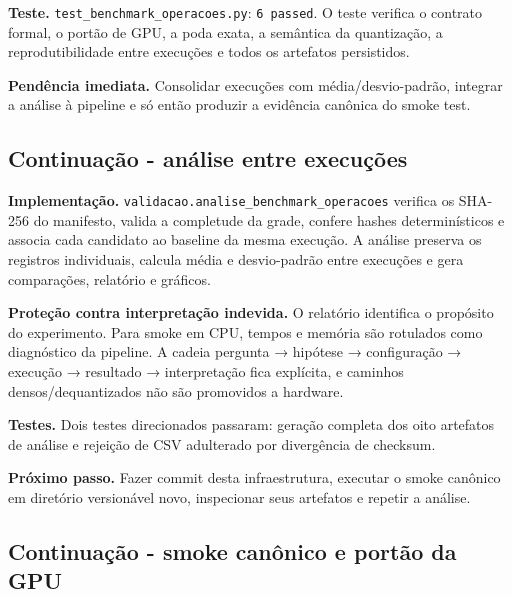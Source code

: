\textbf{Teste.} \texttt{test\_\allowbreak{}benchmark\_\allowbreak{}operacoes.\allowbreak{}py}: \texttt{6 passed}. O teste verifica o contrato formal, o portão de GPU, a poda exata, a semântica da quantização, a reprodutibilidade entre execuções e todos os artefatos persistidos.




\textbf{Pendência imediata.} Consolidar execuções com média/desvio-padrão, integrar a análise à pipeline e só então produzir a evidência canônica do smoke test.



\subsection{Continuação - análise entre execuções}







\textbf{Implementação.} \texttt{validacao.\allowbreak{}analise\_\allowbreak{}benchmark\_\allowbreak{}operacoes} verifica os SHA-256 do manifesto, valida a completude da grade, confere hashes determinísticos e associa cada candidato ao baseline da mesma execução. A análise preserva os registros individuais, calcula média e desvio-padrão entre execuções e gera comparações, relatório e gráficos.







\textbf{Proteção contra interpretação indevida.} O relatório identifica o propósito do experimento. Para smoke em CPU, tempos e memória são rotulados como diagnóstico da pipeline. A cadeia pergunta → hipótese → configuração → execução → resultado → interpretação fica explícita, e caminhos densos/dequantizados não são promovidos a hardware.




\textbf{Testes.} Dois testes direcionados passaram: geração completa dos oito artefatos de análise e rejeição de CSV adulterado por divergência de checksum.




\textbf{Próximo passo.} Fazer commit desta infraestrutura, executar o smoke canônico em diretório versionável novo, inspecionar seus artefatos e repetir a análise.



\subsection{Continuação - smoke canônico e portão da GPU}





